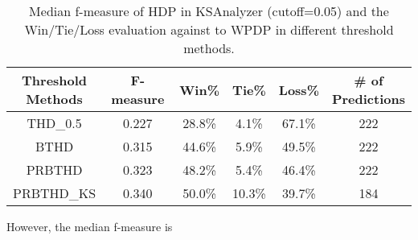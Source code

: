 \begin{table}[t]
\scriptsize
\centering
\caption{Median f-measure of HDP in KSAnalyzer (cutoff=0.05) and the Win/Tie/Loss evaluation against to WPDP in different threshold methods. 
}
\label{tab:threshold_result}
\begin{tabular}{|c||c||c|c|c||c|}
\hline

\specialcell{{\bf Threshold}\\{\bf Methods}}
& {\bf F-measure}
& {\bf Win}\%
& {\bf Tie}\% 
& {\bf Loss}\%
& \specialcell{{\bf \# of}\\{\bf Predictions}} \\ \hline \hline
THD\_0.5 & 0.227	& 28.8\% & 4.1\%	& 67.1\% & 222\\ \hline
BTHD & 0.315	& 44.6\% & 5.9\%	& 49.5\% & 222\\ \hline
PRBTHD & 0.323	& 48.2\% & 5.4\%	& 46.4\% & 222\\ \hline
PRBTHD\_KS& 0.340	& 50.0\% & 10.3\%	& 39.7\% & 184\\ \hline



\end{tabular}
\end{table}

However, the median f-measure is 


